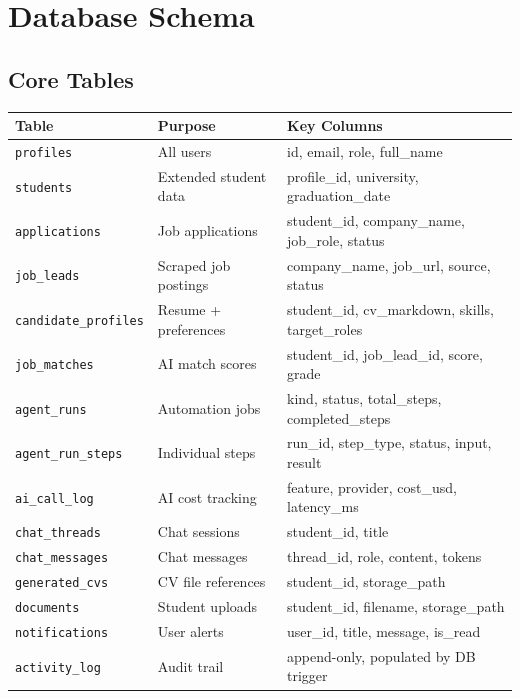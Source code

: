 \documentclass[11pt, a4paper]{article}
\begin{document}
\section{Database Schema}

\subsection{Core Tables}

\begin{center}
\begin{tabular}{lll}
  \toprule
  \textbf{Table} & \textbf{Purpose} & \textbf{Key Columns} \\
  \midrule
  \texttt{profiles}           & All users          & id, email, role, full\_name \\
  \texttt{students}           & Extended student data & profile\_id, university, graduation\_date \\
  \texttt{applications}       & Job applications   & student\_id, company\_name, job\_role, status \\
  \texttt{job\_leads}         & Scraped job postings & company\_name, job\_url, source, status \\
  \texttt{candidate\_profiles}& Resume + preferences & student\_id, cv\_markdown, skills, target\_roles \\
  \texttt{job\_matches}       & AI match scores    & student\_id, job\_lead\_id, score, grade \\
  \texttt{agent\_runs}        & Automation jobs    & kind, status, total\_steps, completed\_steps \\
  \texttt{agent\_run\_steps}  & Individual steps   & run\_id, step\_type, status, input, result \\
  \texttt{ai\_call\_log}      & AI cost tracking   & feature, provider, cost\_usd, latency\_ms \\
  \texttt{chat\_threads}      & Chat sessions      & student\_id, title \\
  \texttt{chat\_messages}     & Chat messages      & thread\_id, role, content, tokens \\
  \texttt{generated\_cvs}     & CV file references & student\_id, storage\_path \\
  \texttt{documents}          & Student uploads    & student\_id, filename, storage\_path \\
  \texttt{notifications}      & User alerts        & user\_id, title, message, is\_read \\
  \texttt{activity\_log}      & Audit trail        & append-only, populated by DB trigger \\
  \bottomrule
\end{tabular}
\end{center}
\end{document}
